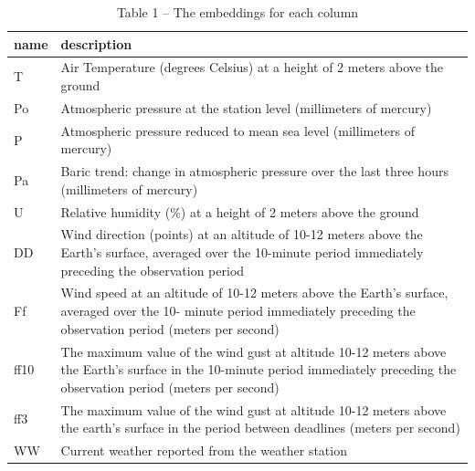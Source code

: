 \begin{table}[H]
\caption*{Table 1 -- The embeddings for each column}
\centering
\begin{tabular}{|l|p{}|}
\hline
name & description                                                                                                                                                                    \\ \hline
T    & Air Temperature (degrees Celsius) at a height of 2 meters above the ground                                                                                                     \\ \hline
Po   & Atmospheric pressure at the station level (millimeters of mercury)                                                                                                             \\ \hline
P    & Atmospheric pressure reduced to mean sea level (millimeters of mercury)                                                                                                        \\ \hline
Pa   & Baric trend: change in atmospheric pressure over the last three hours (millimeters of mercury)                                                                                 \\ \hline
U    & Relative humidity (\%) at a height of 2 meters above the ground                                                                                                                \\ \hline
DD   & Wind direction (points) at an altitude of 10-12 meters above the Earth's surface, averaged over the 10-minute period immediately preceding the observation period              \\ \hline
Ff   & Wind speed at an altitude of 10-12 meters above the Earth's surface, averaged over the 10- minute period immediately preceding the observation period (meters per second)      \\ \hline
ff10 & The maximum value of the wind gust at altitude 10-12 meters above the Earth's surface in the 10-minute period immediately preceding the observation period (meters per second) \\ \hline
ff3  & The maximum value of the wind gust at altitude 10-12 meters above the earth's surface in the period between deadlines (meters per second)                                      \\ \hline
WW   & Current weather reported from the weather station                                                                                                                              \\ \hline

\end{tabular}
\end{table}
